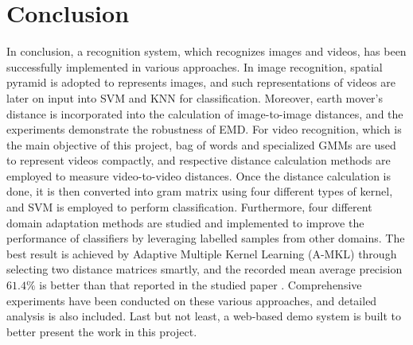 \section{Conclusion}
In conclusion, a recognition system, which recognizes images and videos, has been successfully implemented in various approaches. In image recognition, spatial pyramid is adopted to represents images, and such representations of videos are later on input into SVM and KNN for classification. Moreover, earth mover's distance is incorporated into the calculation of image-to-image distances, and the experiments demonstrate the robustness of EMD. For video recognition, which is the main objective of this project, bag of words and specialized GMMs are used to represent videos compactly, and respective distance calculation methods are employed to measure video-to-video distances. Once the distance calculation is done, it is then converted into gram matrix using four different types of kernel, and SVM is employed to perform classification. Furthermore, four different domain adaptation methods are studied and implemented to improve the performance of classifiers by leveraging labelled samples from other domains. The best result is achieved by Adaptive Multiple Kernel Learning (A-MKL) through selecting two distance matrices smartly, and the recorded mean average precision $61.4\%$ is better than that reported in the studied paper \cite{duan2012visual}. Comprehensive experiments have been conducted on these various approaches, and detailed analysis is also included. Last but not least, a web-based demo system is built to better present the work in this project.  